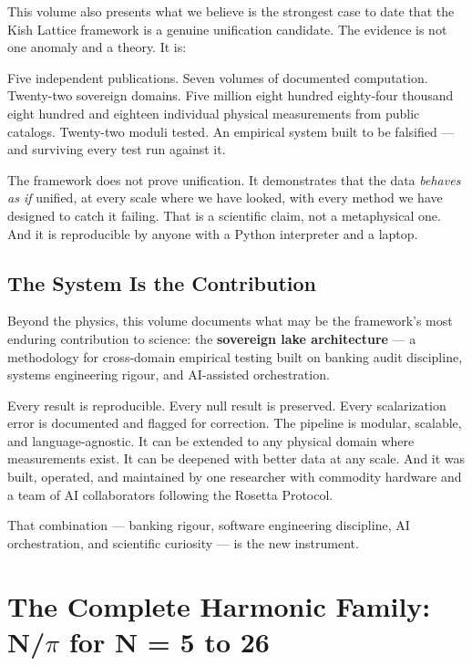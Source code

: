 \documentclass[11pt, letterpaper, openany]{book}
\begin{document}
This volume also presents what we believe is the strongest case to date that the Kish
Lattice framework is a genuine unification candidate. The evidence is not one anomaly
and a theory. It is:

Five independent publications. Seven volumes of documented computation. Twenty-two
sovereign domains. Five million eight hundred eighty-four thousand eight hundred and
eighteen individual physical measurements from public catalogs. Twenty-two moduli tested.
An empirical system built to be falsified --- and surviving every test run against it.

The framework does not prove unification. It demonstrates that the data \emph{behaves
as if} unified, at every scale where we have looked, with every method we have designed
to catch it failing. That is a scientific claim, not a metaphysical one. And it is
reproducible by anyone with a Python interpreter and a laptop.

\section*{The System Is the Contribution}

Beyond the physics, this volume documents what may be the framework's most enduring
contribution to science: the \textbf{sovereign lake architecture} --- a methodology
for cross-domain empirical testing built on banking audit discipline, systems engineering
rigour, and AI-assisted orchestration.

Every result is reproducible. Every null result is preserved. Every scalarization error
is documented and flagged for correction. The pipeline is modular, scalable, and
language-agnostic. It can be extended to any physical domain where measurements exist.
It can be deepened with better data at any scale. And it was built, operated, and
maintained by one researcher with commodity hardware and a team of AI collaborators
following the Rosetta Protocol.

That combination --- banking rigour, software engineering discipline, AI orchestration,
and scientific curiosity --- is the new instrument.

\tableofcontents
\clearpage
\chapter{The Complete Harmonic Family: N/$\pi$ for N = 5 to 26}
\end{document}
